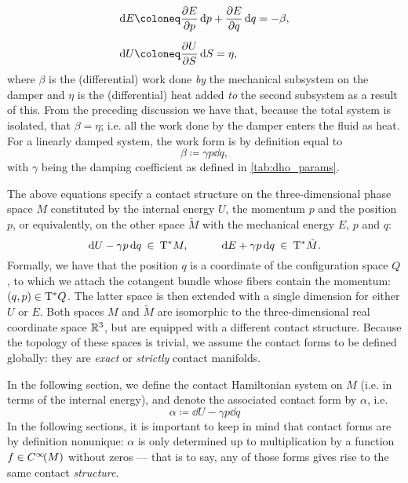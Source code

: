\begin{equation}
    \begin{split}
        \dd{E} &\coloneq \pdv{E}{p}\dd{p} + \pdv{E}{q}\dd{q} = -\beta, \\[0.2cm]
        \dd{U} &\coloneq \pdv{U}{S}\dd{S} = \eta, \\
    \end{split}
\end{equation}
where $\beta$ is the (differential) work done \emph{by} the mechanical subsystem on the damper and $\eta$ is the (differential) heat added \emph{to} the second subsystem as a result of this. From the preceding discussion we have that, because the total system is isolated, that $ \beta = \eta $; i.e. all the work done by the damper enters the fluid as heat. For a linearly damped system, the work form is by definition equal to 
\begin{equation}
    \beta \coloneq \gamma p \dd{q},
    \label{eq:dho_work_form}
\end{equation}
with $\gamma$ being the damping coefficient as defined in \cref{tab:dho_params}. 

The above equations specify a contact structure on the three-dimensional phase space $M$ constituted by the internal energy $U$, the momentum $p$ and the position $p$, or equivalently, on the other space $\tilde{M}$ with the mechanical energy $E$, $p$ and $q$:
$$ \dd{U} - \gamma p \dd{q} \: \in \: \mathrm{T}^*M, \qquad \quad \dd{E} + \gamma p \dd{q} \: \in \: \mathrm{T}^*\tilde{M}. $$
Formally, we have that the position $q$ is a coordinate of the configuration space $Q$, to which we attach the cotangent bundle whose fibers contain the momentum: $ (q, p) \in \mathrm{T}^*Q$. The latter space is then extended with a single dimension for either $U$ or $E$. Both spaces $M$ and $\tilde{M}$ are isomorphic to the three-dimensional real coordinate space $\mathbb{R}^3$, but are equipped with a different contact structure. Because the topology of these spaces is trivial, we assume the contact forms to be defined globally: they are \emph{exact} or \emph{strictly} contact manifolds. %

In the following section, we define the contact Hamiltonian system on $M$ (i.e. in terms of the internal energy), and denote the associated contact form by $\alpha$, i.e.
\begin{equation}
    \alpha \coloneq \dd{U} - \gamma p \dd{q}
    \label{eq:dho_contact_form_thermo}
\end{equation}
In the following sections, it is important to keep in mind that contact forms are by definition nonunique: $\alpha$ is only determined up to multiplication by a function $f \in C^\infty\!\qty(M)$ without zeros --- that is to say, any of those forms gives rise to the same contact \emph{structure}.

